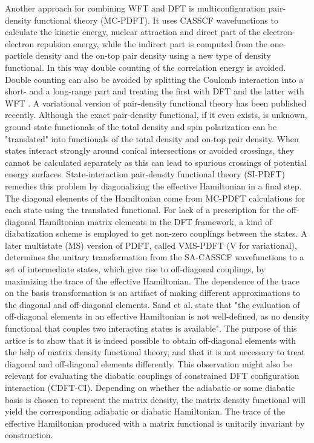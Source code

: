 \documentclass[journal=jpclcd,manuscript=letter]{achemso}
\begin{document}
Another approach for combining WFT and DFT is multiconfiguration pair-density functional theory (MC-PDFT). \cite{LiManni2014}
It uses CASSCF wavefunctions to calculate the kinetic energy, nuclear attraction and direct part of the electron-electron
repulsion energy, while the indirect part is computed from the one-particle density and the on-top pair density using
a new type of density functional. In this way double counting of the correlation energy is avoided.
Double counting can also be avoided by splitting the Coulomb interaction into a short- and a long-range part and
treating the first with DFT and the latter with WFT \cite{Leininger1997combining}.
A variational version of pair-density functional theory has been published recently. \cite{Scott2024}
Although the exact pair-density functional,
if it even exists, is unknown, ground state functionals of the total density and spin polarization can be "translated"
into functionals of the total density and on-top pair density. \cite{LiManni2014}
When states interact strongly around conical intersections or avoided crossings, they cannot be calculated separately as
this can lead to spurious crossings of potential energy surfaces. \cite{Sand2018state}
State-interaction pair-density functional theory (SI-PDFT)
\cite{Sand2018state} remedies this problem by diagonalizing the effective Hamiltonian in a final step.
The diagonal elements of the Hamiltonian come from 
MC-PDFT calculations for each state using the translated functional. 
For lack of a prescription for the off-diagonal Hamiltonian matrix elements in the DFT framework, a kind of diabatization
scheme is employed to get non-zero couplings between the states. \cite{Sand2018state}
A later multistate (MS) version of PDFT, called VMS-PDFT (V for variational), determines the unitary transformation
from the SA-CASSCF wavefunctions to a set of intermediate states, which give rise to off-diagonal couplings,
by maximizing the trace of the effective Hamiltonian. \cite{Bao2020multi} The dependence of the trace on the basis transformation
is an artifact of making different approximations to the diagonal and off-diagonal elements.
Sand et al. state that "the evaluation of off-diagonal elements in an effective Hamiltonian is not well-defined,
as no density functional that couples two interacting states is available". \cite{Sand2018state}
The purpose of this artice is to show
that it is indeed possible to obtain off-diagonal elements with the help of
matrix density functional theory, and that it is not necessary to treat diagonal and off-diagonal elements differently.
This observation might also be relevant for evaluating the diabatic couplings
of constrained DFT configuration interaction (CDFT-CI)\cite{Wu2007configuration}.
Depending on whether the adiabatic or some diabatic basis is chosen to represent the matrix density,
the matrix density functional will yield the corresponding adiabatic or diabatic Hamiltonian.
The trace of the effective Hamiltonian produced with a matrix functional is unitarily invariant by construction.
\end{document}
